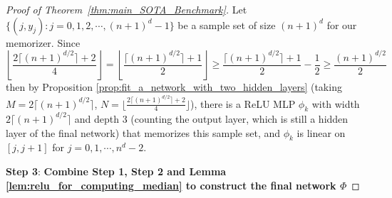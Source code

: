 \documentclass{article}
\numberwithin{equation}{section}
\theoremstyle{definition}
\begin{document}
\begin{proof}[{Proof of Theorem~\ref{thm:main_SOTA_Benchmark}}]
Let $\{(j,y_j):j=0,1,2,\cdots,(n+1)^d-1 \}$ be a sample set of size $(n+1)^d$ for our memorizer. Since  
\[
    \left\lfloor 
        \frac{2 \lceil (n+1)^{d/2} \rceil + 2}{4} 
    \right\rfloor
    =
    \left\lfloor 
        \frac{ \lceil (n+1)^{d/2} \rceil + 1}{2} 
    \right\rfloor
    \ge
    \frac{ \lceil (n+1)^{d/2} \rceil + 1}{2} - \frac{1}{2}
    \ge
    \frac{ (n+1)^{d/2}}{2}
\]
then by Proposition \ref{prop:fit_a_network_with_two_hidden_layers} (taking $M=2 \lceil (n+1)^{d/2} \rceil$, 
$N= \big\lfloor 
        \frac{2 \lceil (n+1)^{d/2} \rceil + 2}{4} 
    \big\rfloor$),
there is a ReLU MLP $\phi_k$ with width $2\lceil (n+1)^{d/2} \rceil$ and depth 3 (counting the output layer, which is still a hidden layer of the final network) that memorizes this sample set, and $\phi_k$ is linear on $[j,j+1]$ for $j=0,1,\cdots,n^d-2$.

\textbf{Step 3}: \textbf{
Combine Step 1, Step 2 and Lemma \ref{lem:relu_for_computing_median} to construct the final network $\Phi$
}


\end{proof}
\end{document}
